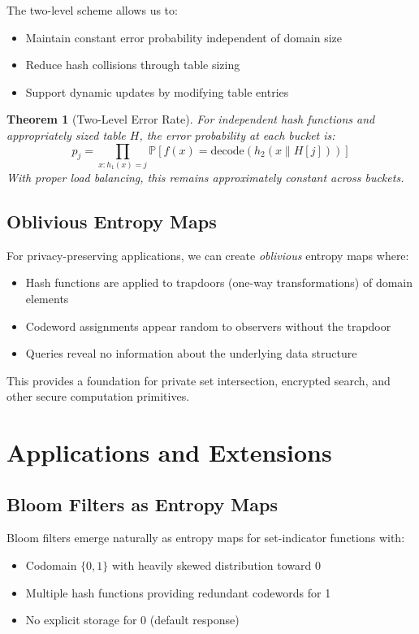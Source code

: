 \documentclass[11pt]{article}
\newtheorem{theorem}{Theorem}
\renewcommand{\Pr}{\mathbb{P}}
\begin{document}
The two-level scheme allows us to:
\begin{itemize}
\item Maintain constant error probability independent of domain size
\item Reduce hash collisions through table sizing
\item Support dynamic updates by modifying table entries
\end{itemize}

\begin{theorem}[Two-Level Error Rate]
For independent hash functions and appropriately sized table $H$, the error probability at each bucket is:
\[
p_j = \prod_{x: h_1(x)=j} \Pr[f(x) = \text{decode}(h_2(x \| H[j]))]
\]
With proper load balancing, this remains approximately constant across buckets.
\end{theorem}

\subsection{Oblivious Entropy Maps}

For privacy-preserving applications, we can create \emph{oblivious} entropy maps where:
\begin{itemize}
\item Hash functions are applied to trapdoors (one-way transformations) of domain elements
\item Codeword assignments appear random to observers without the trapdoor
\item Queries reveal no information about the underlying data structure
\end{itemize}

This provides a foundation for private set intersection, encrypted search, and other secure computation primitives.

\section{Applications and Extensions}

\subsection{Bloom Filters as Entropy Maps}

Bloom filters emerge naturally as entropy maps for set-indicator functions with:
\begin{itemize}
\item Codomain $\{0, 1\}$ with heavily skewed distribution toward 0
\item Multiple hash functions providing redundant codewords for 1
\item No explicit storage for 0 (default response)
\end{itemize}
\end{document}
